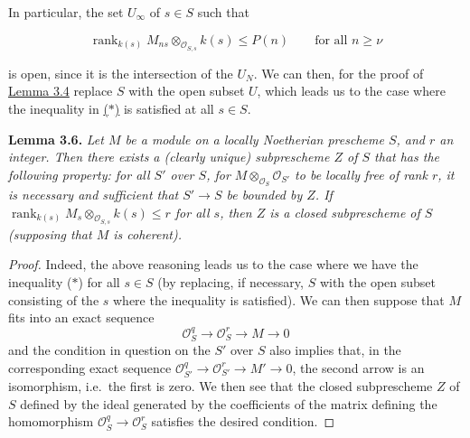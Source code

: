 \documentclass{article}
\newenvironment{itenv}[1]
  {\phantomsection\par\smallskip\noindent\textbf{#1.}\itshape}
  {\par\smallskip}
\newenvironment{eqenv}
  {}
  {}
\newcommand{\oldpage}[1]{\marginpar{\footnotesize$\Big\vert$ \textit{p.~#1}}}
\theoremstyle{definition}
\theoremstyle{definition}
\theoremstyle{definition}
\theoremstyle{definition}
\theoremstyle{remark}
\begin{document}
In particular, the set \(U_\infty\) of \(s\in S\) such that

\leavevmode{}%
\begin{eqenv}
\[
  \operatorname{rank}_{k(s)}M_{ns}\otimes_{{\mathscr{O}}_{S,s}}k(s) \leqslant P(n)
  \qquad\text{for all }n\geqslant\nu
\tag{$*$}
\]

\end{eqenv}

is open, since it is the intersection of the \(U_N\).
We can then, for the proof of \protect\hyperlink{fga-3-iv-lemma-3.4}{Lemma 3.4} replace \(S\) with the open subset \(U\), which leads us to the case where the inequality in \protect\hyperlink{fga-3-iv-equation-asterisk}{(\(*\))} is satisfied at all \(s\in S\).

\leavevmode{}%
\begin{itenv}{Lemma 3.6}
Let \(M\) be a module on a locally Noetherian prescheme \(S\), and \(r\) an integer.
Then there exists a (clearly unique) subprescheme \(Z\) of \(S\) that has the following property:
for all \(S'\) over \(S\), for \(M\otimes_{{\mathscr{O}}_S}{\mathscr{O}}_{S'}\) to be locally free of rank \(r\), it is necessary and sufficient that \(S'\to S\) be bounded by \(Z\).
If \(\operatorname{rank}_{k(s)}M_s\otimes_{{\mathscr{O}}_{S,s}}k(s)\leqslant r\) for all \(s\), then \(Z\) is a closed subprescheme of \(S\) (supposing that \(M\) is coherent).

\end{itenv}

\begin{proof}
\oldpage{221-16}Indeed, the above reasoning leads us to the case where we have the inequality (\(*\)) for all \(s\in S\) (by replacing, if necessary, \(S\) with the open subset consisting of the \(s\) where the inequality is satisfied).
We can then suppose that \(M\) fits into an exact sequence
\[
  {\mathscr{O}}_S^q \to {\mathscr{O}}_S^r \to M \to 0
\]
and the condition in question on the \(S'\) over \(S\) also implies that, in the corresponding exact sequence \({\mathscr{O}}_{S'}^q\to{\mathscr{O}}_{S'}^r\to M'\to 0\), the second arrow is an isomorphism, i.e.~the first is zero.
We then see that the closed subprescheme \(Z\) of \(S\) defined by the ideal generated by the coefficients of the matrix defining the homomorphism \({\mathscr{O}}_S^q\to{\mathscr{O}}_S^r\) satisfies the desired condition.
\end{proof}
\end{document}
